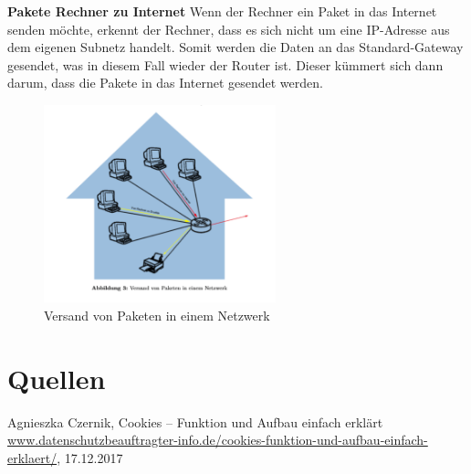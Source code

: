 \textbf{Pakete Rechner zu Internet }
Wenn der Rechner ein Paket in das Internet senden möchte, erkennt der Rechner, dass es sich nicht um eine IP-Adresse aus dem eigenen Subnetz handelt. Somit werden die Daten an das Standard-Gateway gesendet, was in diesem Fall wieder der Router ist. Dieser kümmert sich dann darum, dass die Pakete in das Internet gesendet werden. \\

\begin{figure}[htbp]
\begin{center}
\includegraphics[width=0.6\textwidth]{Bild5}
\caption{Versand von Paketen in einem Netzwerk}
\end{center}
\end{figure}

 

\section{Quellen}
\begin{thebibliography}{999}
 Agnieszka Czernik, Cookies – Funktion und Aufbau einfach erklärt \\ \url{www.datenschutzbeauftragter-info.de/cookies-funktion-und-aufbau-einfach-erklaert/}, 17.12.2017

\end{thebibliography}







